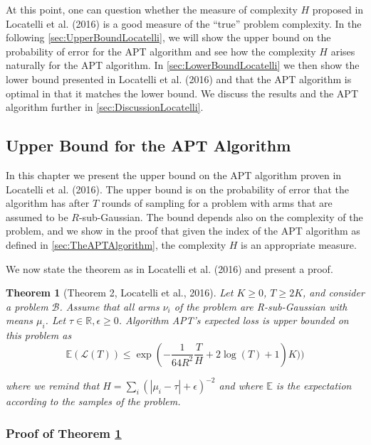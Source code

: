 \documentclass[12pt,]{article}
\newtheorem{theorem}{Theorem}
\begin{document}
At this point, one can question whether the measure of complexity \(H\)
proposed in Locatelli et al. (2016) is a good measure of the ``true''
problem complexity. In the following \autoref{sec:UpperBoundLocatelli},
we will show the upper bound on the probability of error for the APT
algorithm and see how the complexity \(H\) arises naturally for the APT
algorithm. In \autoref{sec:LowerBoundLocatelli} we then show the lower
bound presented in Locatelli et al. (2016) and that the APT algorithm is
optimal in that it matches the lower bound. We discuss the results and
the APT algorithm further in \autoref{sec:DiscussionLocatelli}.

\subsection{\texorpdfstring{Upper Bound for the APT Algorithm
\label{sec:UpperBoundLocatelli}}{Upper Bound for the APT Algorithm }}\label{upper-bound-for-the-apt-algorithm}

In this chapter we present the upper bound on the APT algorithm proven
in Locatelli et al. (2016). The upper bound is on the probability of
error that the algorithm has after \(T\) rounds of sampling for a
problem with arms that are assumed to be \(R\)-sub-Gaussian. The bound
depends also on the complexity of the problem, and we show in the proof
that given the index of the APT algorithm as defined in
\autoref{sec:TheAPTAlgorithm}, the complexity \(H\) is an appropriate
measure.

We now state the theorem as in Locatelli et al. (2016) and present a
proof.

\begin{theorem}[Theorem 2, Locatelli et al., 2016] \label{theorem:LocatelliTheorem4}
Let $K \geq 0$, $T \geq 2K$, and consider a problem $\mathcal{B}$. Assume that all arms $\nu_i$ of the problem are R-sub-Gaussian with means $\mu_i$. Let $\tau \in \mathbb{R}, \epsilon \geq 0$. Algorithm APT's expected loss is upper bounded on this problem as 
\begin{equation*} \mathbb{E}(\mathcal{L}(T)) \leq \exp
(-\frac{1}{64R^2}\frac{T}{H} + 2 \log (T) + 1)K)) \end{equation*}

where we remind that $H = \sum_i (|\mu_i - \tau | + \epsilon)^{-2}$ and where
$\mathbb{E}$ is the expectation according to the samples of the problem.
\end{theorem}

\subsubsection{\texorpdfstring{Proof of Theorem
\ref{theorem:LocatelliTheorem4}}{Proof of Theorem }}\label{proof-of-theorem}
\end{document}
